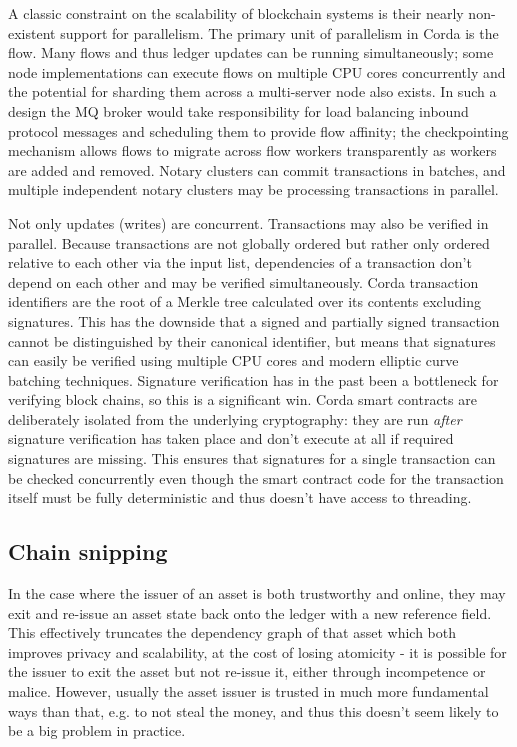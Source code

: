 \documentclass{article}
\begin{document}
A classic constraint on the scalability of blockchain systems is their nearly non-existent support for parallelism.
The primary unit of parallelism in Corda is the flow. Many flows and thus ledger updates can be running
simultaneously; some node implementations can execute flows on multiple CPU cores concurrently and the potential
for sharding them across a multi-server node also exists. In such a design the MQ broker would take responsibility
for load balancing inbound protocol messages and scheduling them to provide flow affinity; the checkpointing
mechanism allows flows to migrate across flow workers transparently as workers are added and removed. Notary
clusters can commit transactions in batches, and multiple independent notary clusters may be processing
transactions in parallel.

Not only updates (writes) are concurrent. Transactions may also be verified in parallel. Because transactions are
not globally ordered but rather only ordered relative to each other via the input list, dependencies of a
transaction don't depend on each other and may be verified simultaneously. Corda transaction identifiers are the
root of a Merkle tree calculated over its contents excluding signatures. This has the downside that a signed and
partially signed transaction cannot be distinguished by their canonical identifier, but means that signatures can
easily be verified using multiple CPU cores and modern elliptic curve batching techniques. Signature verification
has in the past been a bottleneck for verifying block chains, so this is a significant win. Corda smart contracts
are deliberately isolated from the underlying cryptography: they are run \emph{after} signature verification has
taken place and don't execute at all if required signatures are missing. This ensures that signatures for a single
transaction can be checked concurrently even though the smart contract code for the transaction itself must be
fully deterministic and thus doesn't have access to threading.

\subsection{Chain snipping}

In the case where the issuer of an asset is both trustworthy and online, they may exit and re-issue an asset state
back onto the ledger with a new reference field. This effectively truncates the dependency graph of that asset
which both improves privacy and scalability, at the cost of losing atomicity - it is possible for the issuer to
exit the asset but not re-issue it, either through incompetence or malice. However, usually the asset issuer is
trusted in much more fundamental ways than that, e.g. to not steal the money, and thus this doesn't seem likely to
be a big problem in practice.
\end{document}
